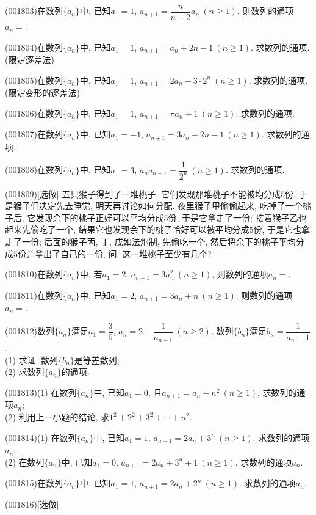 \item (001803)在数列$\{a_n\}$中, 已知$a_1=1$, $a_{n+1}=\dfrac{n}{n+2}a_n \ (n\ge 1)$. 则数列的通项$a_n=$.
\item (001804)在数列$\{a_n\}$中, 已知$a_1=1$, $a_{n+1}=a_n+2n-1\ (n\ge 1)$. 求数列的通项. (限定逐差法)
\item (001805)在数列$\{a_n\}$中, 已知$a_1=1$, $a_{n+1}=2a_n-3\cdot2^n \ (n\ge 1)$. 求数列的通项. (限定变形的逐差法)
\item (001806)在数列$\{a_n\}$中, 已知$a_1=1$, $a_{n+1}=\pi a_n+1 \ (n\ge 1)$. 求数列的通项.
\item (001807)在数列$\{a_n\}$中, 已知$a_1=-1$, $a_{n+1}=3a_n+2n-1\ (n\ge 1)$. 求数列的通项.
\item (001808)在数列$\{a_n\}$中, 已知$a_1=3$, $a_{n}a_{n+1}=\dfrac{1}{2^n}\ (n\ge 1)$. 求数列的通项.
\item (001809)[选做]
五只猴子得到了一堆桃子, 它们发现那堆桃子不能被均分成$5$份, 于是猴子们决定先去睡觉, 明天再讨论如何分配. 夜里猴子甲偷偷起来, 吃掉了一个桃子后, 它发现余下的桃子正好可以平均分成$5$份, 于是它拿走了一份; 接着猴子乙也起来先偷吃了一个, 结果它也发现余下的桃子恰好可以被平均分成$5$份, 于是它也拿走了一份; 后面的猴子丙, 丁, 戊如法炮制, 先偷吃一个, 然后将余下的桃子平均分成$5$份并拿出了自己的一份, 问: 这一堆桃子至少有几个?
\item (001810)在数列$\{a_n\}$中, 若$a_1=2$, $a_{n+1}=3a_n^2\ (n \ge 1)$, 则数列的通项$a_n=$.
\item (001811)在数列$\{a_n\}$中, 已知$a_1=2$, $a_{n+1}=3a_n+n\ (n \ge 1)$. 则数列的通项$a_n=$.
\item (001812)数列$\{a_n\}$满足$a_1=\dfrac{3}{5}$, $a_n=2-\dfrac{1}{a_{n-1}}\ (n\ge 2)$, 数列$\{b_n\}$满足$b_n=\dfrac{1}{a_n-1}$.\\ 
(1) 求证: 数列$\{b_n\}$是等差数列;\\ 
(2) 求数列$\{a_n\}$的通项.
\item (001813)(1) 在数列$\{a_n\}$中, 已知$a_1=0$, 且$a_{n+1}=a_n+n^2 \ (n\ge 1)$, 求数列的通项$a_n$;\\ 
(2) 利用上一小题的结论, 求$1^2+2^2+3^2+\cdots+n^2$.
\item (001814)(1) 在数列$\{a_n\}$中, 已知$a_1=1$, $a_{n+1}=2a_n+3^n\ (n \ge 1)$. 求数列的通项$a_n$;\\ 
(2) 在数列$\{a_n\}$中, 已知$a_1=0$, $a_{n+1}=2a_n+3^n+1\ (n\ge 1)$. 求数列的通项$a_n$.
\item (001815)在数列$\{a_n\}$中, 已知$a_1=1$, $a_{n+1}=2a_n+2^n\ (n \ge 1)$. 求数列的通项$a_n$.
\item (001816)[选做]
